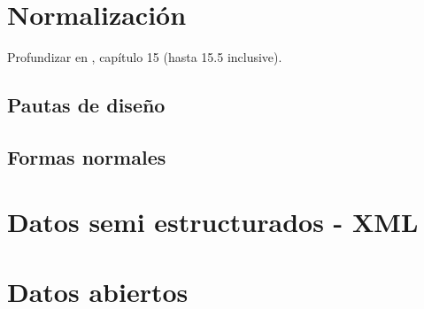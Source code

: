 \section{Normalización}

Profundizar en \cite{elmasri2015}, capítulo 15 (hasta 15.5 inclusive).

\subsection{Pautas de diseño}

\subsection{Formas normales}

\section{Datos semi estructurados - XML}

\section{Datos abiertos}
